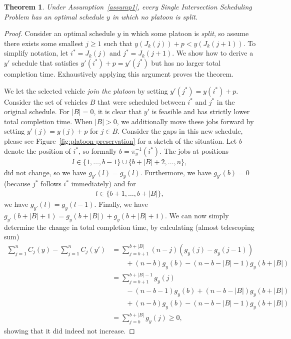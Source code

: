 \documentclass{article}
\theoremstyle{definition}
\theoremstyle{plain}
\newtheorem{theorem}{Theorem}[section]
\begin{document}
\begin{theorem}
  \label{prop:platoon-preservation}
  Under Assumption~\ref{assump1}, every Single Intersection Scheduling Problem has an
  optimal schedule $y$ in which no platoon is split.
\end{theorem}
\begin{proof}
  Consider an optimal schedule $y$ in which some platoon is \textit{split}, so
  assume there exists some smallest $j \geq 1$ such that
  $y(J_{k}(j)) + p < y(J_{k}(j+1)) $. To simplify notation, let $i^{*}=J_{k}(j)$
  and $j^{*}=J_{k}(j+1)$. We show how to derive a $y'$ schedule that satisfies
  $y'(i^{*}) + p = y'(j^{*})$ but has no larger total completion time. Exhaustively
  applying this argument proves the theorem.

  We let the selected vehicle \textit{join the platoon} by setting
  $y'(j^{*}) = y(i^{*}) + p$. Consider the set of vehicles $B$ that were
  scheduled between $i^{*}$ and $j^{*}$ in the original schedule. For $|B| = 0$,
  it is clear that $y'$ is feasible and has strictly lower total completion
  time. When $|B| > 0$, we additionally move these jobs forward by setting
  $y'(j) = y(j) + p$ for $j \in B$.
  Consider the gaps in this new schedule, please see Figure~\ref{fig:platoon-preservation} for a sketch of the situation.
  Let $b$ denote the position of $i^{*}$, so formally $b = \pi_{y}^{-1}(i^{*})$.
  The jobs at positions
  \begin{align*}
    l\in\{1,\dots, b-1\} \cup \{b + |B| + 2, \dots, n\} ,
  \end{align*}
  did not change, so we have $g_{y'}(l) = g_{y}(l)$.
  Furthermore, we have $g_{y'}(b) = 0$ (because $j^{*}$ follows $i^{*}$ immediately) and for
  \begin{align*}
    l \in \{b+1, \dots, b+|B|\} ,
  \end{align*}
  we have $g_{y'}(l) = g_{y}(l-1)$. Finally, we have
  $g_{y'}(b+|B|+1) = g_{y}(b+|B|) + g_{y}(b+|B|+1)$. We can now simply determine
  the change in total completion time, by calculating (almost telescoping sum)
  \begin{align*}
    \sum_{j=1}^{n} C_{j}(y) - \sum_{j=1}^{n} C_{j}(y') &= \sum_{j=b+1}^{b+|B|} (n-j) (g_{y}(j) - g_{y}(j-1)) \\
    &\quad \quad + (n-b) g_{y}(b) - (n-b-|B|-1) g_{y}(b+|B|) \\
    &= \sum_{j=b+1}^{b+|B|-1} g_{y}(j) \\
    &\quad \quad - (n-b-1)g_{y}(b) + (n-b-|B|) g_{y}(b+|B|) \\
    &\quad \quad + (n-b) g_{y}(b) - (n-b-|B|-1) g_{y}(b+|B|) \\
    &= \sum_{j=b}^{b+|B|} g_{y}(j) \geq 0 ,
  \end{align*}
  showing that it did indeed not increase.
\end{proof}
\end{document}
